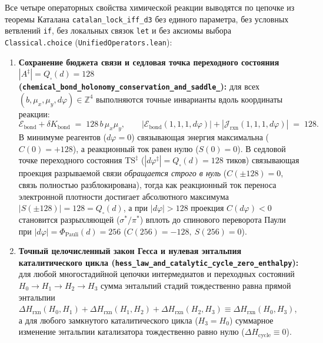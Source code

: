 \begin{theorem}[Аналитические теоремы химической кинетики, переходного состояния $|A^\ddagger|=128$, селективности Вудворда--Хоффмана и катализа на кубооктаэдре~$O_2$]
\label{thm:applied-chemical-reactions-and-catalysis}
Все четыре операторных свойства химической реакции выводятся по цепочке из теоремы Каталана \texttt{catalan\_\allowbreak lock\_\allowbreak iff\_\allowbreak d3} без единого параметра, без условных ветвлений \texttt{if}, без локальных связок \texttt{let} и без аксиомы выбора \texttt{Classical.choice} (\texttt{UnifiedOperators.lean}):
\begin{enumerate}[leftmargin=*]
\item \textbf{Сохранение бюджета связи и седловая точка переходного состояния $|A^\ddagger| = Q_\square(d) = 128$ (\texttt{chemical\_\allowbreak bond\_\allowbreak holonomy\_\allowbreak conservation\_\allowbreak and\_\allowbreak saddle\_}):}
  для всех $(b,\mu_x,\mu_y,d\varphi)\in\mathbb{Z}^4$ выполняются точные инварианты вдоль координаты реакции:
  \begin{equation}
  \label{eq:applied-bond-budget-and-l1}
    \mathcal{E}_{\mathrm{bond}} + \delta K_{\mathrm{bond}} \;=\; 128\,b\,\mu_x\mu_y,
    \qquad
    |\mathcal{E}_{\mathrm{bond}}(1,1,1,d\varphi)| + |\mathcal{J}_{\mathrm{rxn}}(1,1,1,d\varphi)| \;=\; 128.
  \end{equation}
  В минимуме реагентов ($d\varphi=0$) связывающая энергия максимальна ($C(0)=+128$), а реакционный ток равен нулю ($S(0)=0$).
  В седловой точке переходного состояния $\mathrm{TS}^\ddagger$ ($|d\varphi^\ddagger| = Q_\square(d) = 128$ тиков) связывающая проекция разрываемой связи \emph{обращается строго в нуль} ($C(\pm 128) = 0$, связь полностью разблокирована), тогда как реакционный ток переноса электронной плотности достигает абсолютного максимума $|S(\pm 128)| = 128 = Q_\square(d)$, а при $|d\varphi| > 128$ проекция $C(d\varphi) < 0$ становится разрыхляющей ($\sigma^*/\pi^*$) вплоть до спинового переворота Паули при $|d\varphi| = \Phi_{\mathrm{Pauli}}(d) = 256$ ($C(256) = -128,\ S(256) = 0$).
\item \textbf{Точный целочисленный закон Гесса и нулевая энтальпия каталитического цикла (\texttt{hess\_\allowbreak law\_\allowbreak and\_\allowbreak catalytic\_\allowbreak cycle\_\allowbreak zero\_\allowbreak enthalpy}):}
  для любой многостадийной цепочки интермедиатов и переходных состояний $H_0 \to H_1 \to H_2 \to H_3$ сумма энтальпий стадий тождественно равна прямой энтальпии $\Delta H_{\mathrm{rxn}}(H_0,H_1) + \Delta H_{\mathrm{rxn}}(H_1,H_2) + \Delta H_{\mathrm{rxn}}(H_2,H_3) \equiv \Delta H_{\mathrm{rxn}}(H_0,H_3)$, а для любого замкнутого каталитического цикла ($H_3 = H_0$) суммарное изменение энтальпии катализатора тождественно равно нулю ($\Delta H_{\mathrm{cycle}} \equiv 0$).

\end{enumerate}
\end{theorem}
